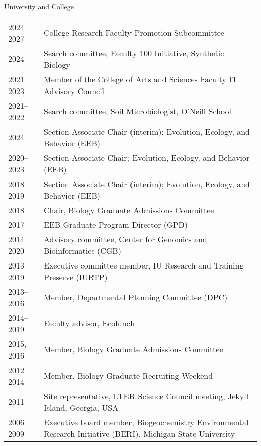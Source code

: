 \documentclass[11pt]{article}  %
\begin{document}
\vspace{-0.5em}
\textnormal{\underline{University and College}} \\[-2.5em]

\begin{longtable}{@{}p{4em}@{\hspace{2em}}p{}@{}}
2024--2027 & College Research Faculty Promotion Subcommittee \\
2024       & Search committee, Faculty 100 Initiative, Synthetic Biology \\
2021--2023 & Member of the College of Arts and Sciences Faculty IT Advisory Council \\
2021--2022 & Search committee, Soil Microbiologist, O’Neill School \\
2024       & Section Associate Chair (interim); Evolution, Ecology, and Behavior (EEB) \\
2020--2023 & Section Associate Chair; Evolution, Ecology, and Behavior (EEB) \\
2018--2019 & Section Associate Chair (interim); Evolution, Ecology, and Behavior (EEB) \\
2018       & Chair, Biology Graduate Admissions Committee \\
2017       & EEB Graduate Program Director (GPD) \\
2014--2020 & Advisory committee, Center for Genomics and Bioinformatics (CGB) \\
2013--2019 & Executive committee member, IU Research and Training Preserve (IURTP) \\
2013--2016 & Member, Departmental Planning Committee (DPC) \\
2014--2019 & Faculty advisor, Ecolunch \\
2015, 2016 & Member, Biology Graduate Admissions Committee \\
2012--2014 & Member, Biology Graduate Recruiting Weekend \\
2011       & Site representative, LTER Science Council meeting, Jekyll Island, Georgia, USA \\
2006--2009 & Executive board member, Biogeochemistry Environmental Research Initiative (BERI), Michigan State University \\
\end{longtable}
\end{document}
